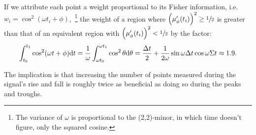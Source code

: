 \documentclass{article}
\begin{document}
If we attribute each point a weight proportional to its Fisher information, i.e. $w_i = \cos^2(\omega t_i + \phi)$,~\footnote{The variance of $\omega$ is proportional to the (2,2)-minor, in which time doesn't figure, only the squared cosine.} the weight of a region where $\bkt{\mupp}^2 \geq\sfrac12$ is greater than that of an equivalent region with $\bkt{\mupp}^2 < \sfrac12$  by the factor:
\begin{align*}
	\int_{t_0}^{t_1}\cos^2(\omega t + \phi)\mathrm{d} t = \frac1\omega\int_{\omega t_0}^{\omega t_1} \cos^2\theta\mathrm{d}\theta = \frac{\Delta t}{2} + \frac{1}{2\omega}\sin\omega\Delta t\cos\omega\Sigma t \approx 1.9.
\end{align*}

The implication is that increasing the number of points measured during the signal's rise and fall is roughly twice as beneficial as doing so during the peaks and troughs.

%
%
\end{document}
